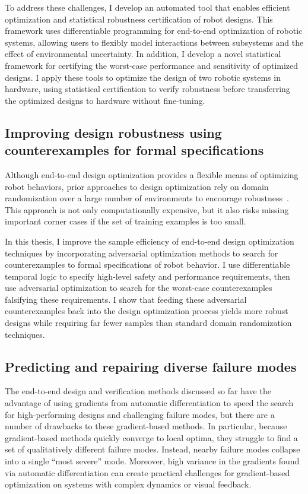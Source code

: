 To address these challenges, I develop an automated tool that enables efficient optimization and statistical robustness certification of robot designs. This framework uses differentiable programming for end-to-end optimization of robotic systems, allowing users to flexibly model interactions between subsystems and the effect of environmental uncertainty. In addition, I develop a novel statistical framework for certifying the worst-case performance and sensitivity of optimized designs. I apply these tools to optimize the design of two robotic systems in hardware, using statistical certification to verify robustness before transferring the optimized designs to hardware without fine-tuning.

\subsection{Improving design robustness using counterexamples for formal specifications}

Although end-to-end design optimization provides a flexible means of optimizing robot behaviors, prior approaches to design optimization rely on domain randomization over a large number of environments to encourage robustness~\cite{tobinDomainRandomizationTransferring2017,dawsonCertifiableRobotDesign2022}. This approach is not only computationally expensive, but it also risks missing important corner cases if the set of training examples is too small.

In this thesis, I improve the sample efficiency of end-to-end design optimization techniques by incorporating adversarial optimization methods to search for counterexamples to formal specifications of robot behavior. I use differentiable temporal logic to specify high-level safety and performance requirements, then use adversarial optimization to search for the worst-case counterexamples falsifying these requirements. I show that feeding these adversarial counterexamples back into the design optimization process yields more robust designs while requiring far fewer samples than standard domain randomization techniques.

\subsection{Predicting and repairing diverse failure modes}

The end-to-end design and verification methods discussed so far have the advantage of using gradients from automatic differentiation to speed the search for high-performing designs and challenging failure modes, but there are a number of drawbacks to these gradient-based methods. In particular, because gradient-based methods quickly converge to local optima, they struggle to find a set of qualitatively different failure modes. Instead, nearby failure modes collapse into a single ``most severe'' mode. Moreover, high variance in the gradients found via automatic differentiation can create practical challenges for gradient-based optimization on systems with complex dynamics or visual feedback.


